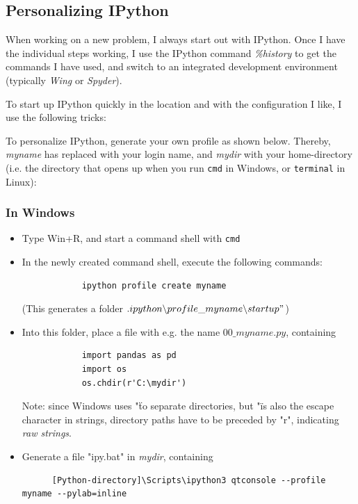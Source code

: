 \subsection{Personalizing IPython}

When working on a new problem, I always start out with IPython. Once
I have the individual steps working, I use the IPython command \emph{\%history} to get the commands I have used, and switch to an integrated development environment (typically \emph{Wing} or \emph{Spyder}).

To start up IPython quickly in the location and with the configuration I like, I use the following tricks:

To personalize IPython, generate your own profile as shown below. Thereby, \emph{myname} has replaced with your login name, and \emph{mydir} with your home-directory (i.e. the directory that opens up when you run \lstinline{cmd} in Windows, or \lstinline{terminal} in Linux):

\subsubsection{In Windows}

\begin{itemize}
  \item Type Win+R, and start a command shell with \lstinline{cmd}
  \item In the newly created command shell, execute the following commands:
        \begin{lstlisting}
            ipython profile create myname
        \end{lstlisting}
        (This generates a folder $.ipython \backslash profile\_myname \backslash startup"$)
  \item Into this folder, place a file with e.g. the name $00\_myname.py$, containing
        \begin{lstlisting}
            import pandas as pd
            import os
            os.chdir(r'C:\mydir')
        \end{lstlisting}
        Note: since Windows uses "\" to separate directories, but "\" is also the escape character in strings, directory paths have to be preceded by "r", indicating \emph{raw strings}.
  \item Generate a file "ipy.bat" in \emph{mydir}, containing
      \begin{lstlisting}
      [Python-directory]\Scripts\ipython3 qtconsole --profile myname --pylab=inline
      \end{lstlisting}
\end{itemize}

